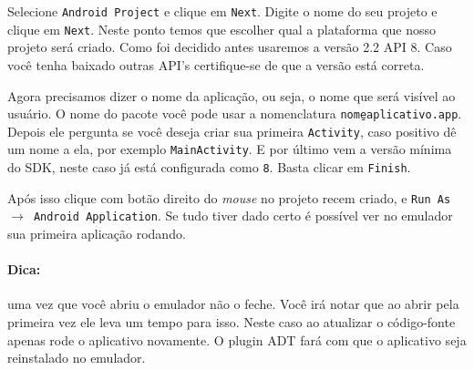Selecione \texttt{Android Project} e clique em \texttt{Next}. Digite o nome do seu projeto e clique em
\texttt{Next}. Neste ponto temos que escolher qual a plataforma que nosso projeto será criado. Como foi
decidido antes usaremos a versão 2.2 API 8. Caso você tenha baixado outras API's certifique-se de que
a versão está correta.

Agora precisamos dizer o nome da aplicação, ou seja, o nome que será visível ao usuário. O nome do pacote
você pode usar a nomenclatura \texttt{nome\b{ }aplicativo.app}. Depois ele pergunta se você deseja
criar sua primeira \texttt{Activity}, caso positivo dê um nome a ela, por exemplo \texttt{MainActivity}.
E por último vem a versão mínima do SDK, neste caso já está configurada como \texttt{8}. Basta clicar
em \texttt{Finish}.

Após isso clique com botão direito do \textit{mouse} no projeto recem criado, e \texttt{Run As $\rightarrow$
Android Application}. Se tudo tiver dado certo é possível ver no emulador sua primeira aplicação
rodando.

\paragraph{Dica:} uma vez que você abriu o emulador não o feche. Você irá notar que ao abrir
pela primeira vez ele leva um tempo para isso. Neste caso ao atualizar o código-fonte apenas
rode o aplicativo novamente. O plugin ADT fará com que o aplicativo seja reinstalado no emulador.